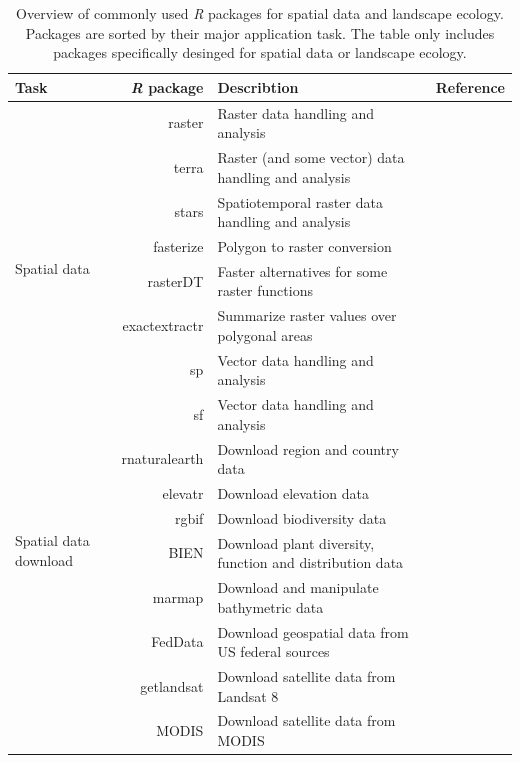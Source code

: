 \documentclass[smallextended]{svjour3}       %
\begin{document}
\begin{table}

\scriptsize 

\captionsetup{font=scriptsize}

\caption{Overview of commonly used \textit{R} packages for spatial data and landscape ecology. Packages are sorted by their major application task. The table only includes packages specifically desinged for spatial data or landscape ecology.}

\begin{tabularx}{1.35\linewidth}{lrXr}

\hline
Task & \textit{R} package & Describtion & Reference \\
\hline
\multirow{8}{*}{Spatial data} & raster & Raster data handling and analysis & \cite{Hijmans2019} \\
& terra & Raster (and some vector) data handling and analysis & \cite{Hijmans2021} \\
& stars & Spatiotemporal raster data handling and analysis & \cite{Pebesma2019} \\
& fasterize & Polygon to raster conversion & \cite{Ross2020} \\
& rasterDT & Faster alternatives for some raster functions & \cite{OBrien2020} \\
& exactextractr & Summarize raster values over polygonal areas & \cite{Baston2020} \\
& sp & Vector data handling and analysis & \cite{Pebesma2005,Bivand2013} \\
& sf & Vector data handling and analysis & \cite{Pebesma2018} \\
\hline
\multirow{6}{*}{Spatial data download} & rnaturalearth & Download region and country data & \cite{South2017} \\
& elevatr & Download elevation data & \cite{Hollister2020} \\
& rgbif & Download biodiversity data & \cite{Chamberlain2017} \\
& BIEN & Download plant diversity, function and distribution data & \cite{Maitner2020} \\
& marmap & Download and manipulate bathymetric data & \cite{Pante2013} \\
& FedData & Download geospatial data from US federal sources & \cite{Bocinsky2019} \\
& getlandsat & Download satellite data from Landsat 8 & \cite{Chamberlain2018} \\
& MODIS & Download satellite data from MODIS & \cite{Mattiuzzi2020} \\

\end{tabularx}
\end{table}
\end{document}
